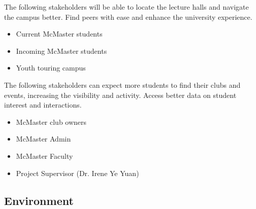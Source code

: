 \documentclass{article}
\begin{document}
\quad The following stakeholders will be able to locate the lecture halls and navigate the campus better. Find peers with ease and enhance the university experience.

\begin{itemize}
    \item Current McMaster students
    \item Incoming McMaster students    
    \item Youth touring campus
\end{itemize}
    \quad The following stakeholders can expect more students to find their clubs and events, increasing the visibility and activity. Access better data on student interest and interactions. 
\begin{itemize}
    \item McMaster club owners
    \item McMaster Admin
    \item McMaster Faculty
    \item Project Supervisor (Dr. Irene Ye Yuan)
\end{itemize}

\subsection{Environment}

\end{document}

